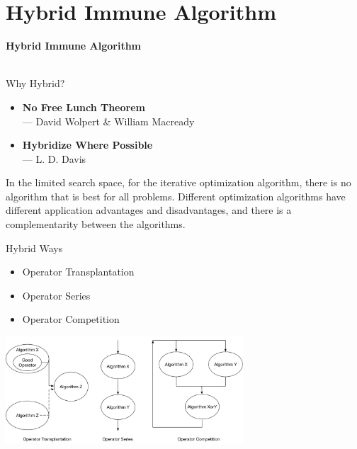 \section{Hybrid Immune Algorithm}

\begin{frame}
\centering \Huge \textbf{Hybrid Immune Algorithm} \\~\\
\large {}
\end{frame}

\begin{frame}{Why Hybrid?}
\begin{itemize}
\item {\textbf{No Free Lunch Theorem}\\ \footnotesize{--- David Wolpert \& William Macready}}
\item {\textbf{Hybridize Where Possible}\\ \footnotesize{--- L. D. Davis}}
\end{itemize}
\begin{block}
\small{In the limited search space, for the iterative optimization algorithm, there is no algorithm that is best for all problems. Different optimization algorithms have different application advantages and disadvantages, and there is a complementarity between the algorithms.}
\end{block}
\end{frame}

\begin{frame}{Hybrid Ways}

\begin{itemize}
\item {Operator Transplantation}
\item {Operator Series}
\item {Operator Competition}
\end{itemize} 
\begin{center}
\includegraphics[height=4cm]{img/hybrid_immune.jpg}
\end{center}
\end{frame}


